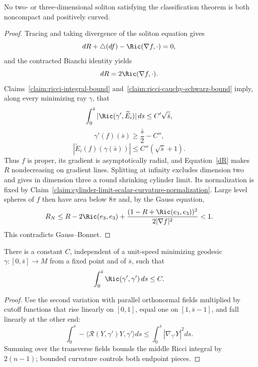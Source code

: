 \begin{proposition}\label{prop:no-noncompact-positive-curvature-soliton}
\label{noncompsol}
No two- or three-dimensional soliton satisfying the classification
theorem is both noncompact and positively curved.
\end{proposition}
\begin{proof}
\sketch Tracing and taking divergence of the soliton equation gives
\begin{equation}\label{Rfeqn}
 dR+\triangle(df)-\Ric(\nabla f,\cdot)=0,
\end{equation}
and the contracted Bianchi identity yields
\begin{equation}\label{dR}
 dR=2\Ric(\nabla f,\cdot).
\end{equation}
Claims~\ref{claim:ricci-integral-bound}
and~\ref{claim:ricci-cauchy-schwarz-bound} imply, along every
minimizing ray $\gamma$, that
\begin{equation}\label{sqrts}
 \int_0^{\bar s}|\Ric(\gamma',\widetilde E_i)|\,ds
 \leq C'\sqrt{\bar s},
\end{equation}
\begin{equation}\label{X}
 \gamma'(f)(\bar s)\geq\frac{\bar s}{2}-C'',
\end{equation}
\begin{equation}\label{sqrts2}
 |\widetilde E_i(f)(\gamma(\bar s))|
 \leq C''(\sqrt{\bar s}+1).
\end{equation}
Thus $f$ is proper, its gradient is asymptotically radial, and
Equation~\ref{dR} makes $R$ nondecreasing on gradient lines.
Splitting at infinity excludes dimension two and gives in dimension
three a round shrinking cylinder limit. Its normalization is fixed
by Claim~\ref{claim:cylinder-limit-scalar-curvature-normalization}.
Large level spheres of $f$ then have area below $8\pi$ and, by the
Gauss equation,
\begin{equation}\label{R_N}
 R_N\leq R-2\Ric(e_3,e_3)
 +\frac{(1-R+\Ric(e_3,e_3))^2}{2|\nabla f|^2}<1.
\end{equation}
This contradicts Gauss--Bonnet.
\end{proof}

\begin{claim}\label{claim:ricci-integral-bound}
There is a constant $C$, independent of a unit-speed minimizing
geodesic $\gamma:[0,\bar s]\to M$ from a fixed point and of
$\bar s$, such that
\[
 \int_0^{\bar s}\Ric(\gamma',\gamma')\,ds\leq C.
\]
\end{claim}
\begin{proof}
\sketch Use the second variation with parallel orthonormal fields
multiplied by cutoff functions that rise linearly on $[0,1]$, equal
one on $[1,\bar s-1]$, and fall linearly at the other end:
\begin{equation}\label{Yeqn}
 \int_0^{\bar s}-\langle\mathcal R(Y,\gamma')Y,\gamma'\rangle ds
 \leq\int_0^{\bar s}|\nabla_{\gamma'}Y|^2ds.
\end{equation}
Summing over the transverse fields bounds the middle Ricci integral
by $2(n-1)$; bounded curvature controls both endpoint pieces.
\end{proof}

